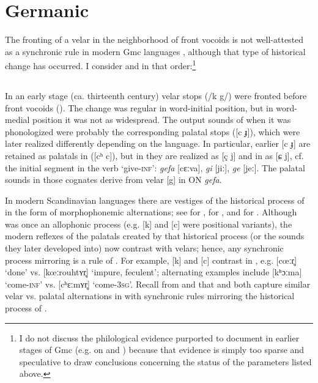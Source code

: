 \section{Germanic}
The fronting of a velar in the neighborhood of front vocoids is not well-attested as a synchronic rule in modern Gmc languages \citep{Hall2020}, although that type of historical change has occurred. I consider  and  in that order:\footnote{{I do not discuss the philological evidence purported to document  in earlier stages of Gmc (e.g. \citealt{VanderHoek2010} on  and ) because that evidence is simply too sparse and speculative to draw conclusions concerning the status of the parameters listed above.}}

\subsection{}
In an early stage (ca. thirteenth century) velar stops (/k g/) were fronted before front vocoids (\citealt{Haugen1976,Haugen1982}). The change was regular in word-initial position, but in word-medial position it was not as widespread. The output sounds of  when it was phonologized were probably the corresponding palatal stops ([c ɟ]), which were later realized differently depending on the language. In particular, earlier [c ɟ] are retained as palatals in  ([cʰ c]), but in  they are realized as [ç j] and in  as [ɕ j], cf. the initial segment in the verb ‘give-\textsc{inf}’:  \textit{gefa} [cɛːva],  \textit{gi} [jiː],  \textit{ge} [jeː]. The palatal sounds in those cognates derive from velar [g] in ON \textit{gefa}.

In modern Scandinavian languages there are vestiges of the historical process of  in the form of morphophonemic alternations; see \citet[112]{Kristoffersen2000} for , \citet[101--103]{arnason2011} for , and \citet[109]{Riad2014} for . Although  was once an allophonic process (e.g. [k] and [c] were positional variants), the modern reflexes of the palatals created by that historical process (or the sounds they later developed into) now contrast with velars; hence, any synchronic process mirroring  is a rule of . For example, [k] and [c] contrast in , e.g. [cœːr̥] ‘done’ vs. [kœːrouhtʏr̥] ‘impure, feculent’; alternating examples include [kʰɔːma] ‘come-\textsc{inf}’ vs. [cʰɛːmʏr̥] ‘come-\textsc{3}\textsc{sg}’. Recall from  and  that \citet{Anderson1981} and \citet{Calabrese2005} both capture similar velar vs. palatal alternations in  with synchronic rules mirroring the historical process of .

